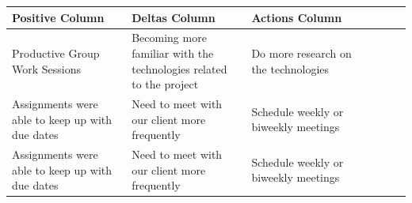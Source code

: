 \documentclass[onecolumn, draftclsnofoot,10pt, compsoc]{IEEEtran}
\begin{document}
\begin{tabular}
{| p{0.3\linewidth}| p{0.3\linewidth} | p{0.3\linewidth} | p{0.3\linewidth} |}


\hline Positive Column&Deltas Column&Actions Column\\


\hline 
Productive Group Work Sessions 
&
Becoming more familiar with the technologies related to the project
&
Do more research on the technologies
\\

\hline 
Assignments were able to keep up with due dates 
&
Need to meet with our client more frequently
&
Schedule weekly or biweekly meetings
\\
\hline

\hline 
Assignments were able to keep up with due dates 
&
Need to meet with our client more frequently
&
Schedule weekly or biweekly meetings
\\
\hline
\end{tabular}
\end{document}
